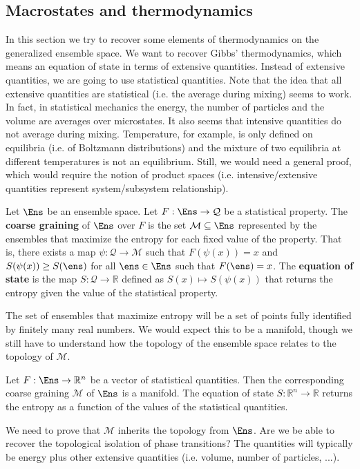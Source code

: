 \subsection{Macrostates and thermodynamics}

In this section we try to recover some elements of thermodynamics on the generalized ensemble space. We want to recover Gibbs' thermodynamics, which means an equation of state in terms of extensive quantities. Instead of extensive quantities, we are going to use statistical quantities. Note that the idea that all extensive quantities are statistical (i.e. the average during mixing) seems to work. In fact, in statistical mechanics the energy, the number of particles and the volume are averages over microstates. It also seems that intensive quantities do not average during mixing. Temperature, for example, is only defined on equilibria (i.e. of Boltzmann distributions) and the mixture of two equilibria at different temperatures is not an equilibrium. Still, we would need a general proof, which would require the notion of product spaces (i.e. intensive/extensive quantities represent system/subsystem relationship).

\begin{mathSection}
\begin{defn}
	Let $\Ens$ be an ensemble space. Let $F : \Ens \to \mathcal{Q}$ be a statistical property. The \textbf{coarse graining} of $\Ens$ over $F$ is the set $\mathcal{M} \subseteq \Ens$ represented by the ensembles that maximize the entropy for each fixed value of the property. That is, there exists a map $\psi : \mathcal{Q} \to \mathcal{M}$ such that $F(\psi(x)) = x$ and $S(\psi(x)) \geq S(\ens)$ for all $\ens \in \Ens$ such that $F(\ens) = x$. The \textbf{equation of state} is the map $S : \mathcal{Q} \to \mathbb{R}$ defined as $S(x) \mapsto S(\psi(x))$ that returns the entropy given the value of the statistical property.
\end{defn}
\end{mathSection}

The set of ensembles that maximize entropy will be a set of points fully identified by finitely many real numbers. We would expect this to be a manifold, though we still have to understand how the topology of the ensemble space relates to the topology of $\mathcal{M}$.

\begin{mathSection}
\begin{conj}
	Let $F : \Ens \to \mathbb{R}^n$ be a vector of statistical quantities. Then the corresponding coarse graining $\mathcal{M}$ of $\Ens$ is a manifold. The equation of state $S : \mathbb{R}^n \to \mathbb{R}$ returns the entropy as a function of the values of the statistical quantities.
\end{conj}

\begin{remark}
	We need to prove that $\mathcal{M}$ inherits the topology from $\Ens$. Are we be able to recover the topological isolation of phase transitions? The quantities will typically be energy plus other extensive quantities (i.e. volume, number of particles, ...).
\end{remark}
\end{mathSection}

